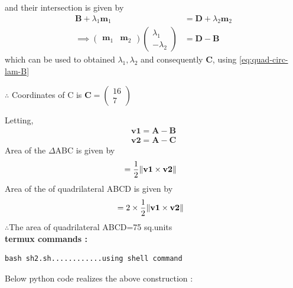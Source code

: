 \documentclass[10pt, a4paper]{article}
\newcommand{\myvec}[1]{\ensuremath{\begin{pmatrix}#1\end{pmatrix}}}
\let\vec\mathbf
\begin{document}
and their intersection is given by 
\begin{align}
	 \vec{B} + \lambda_1 \vec{m}_1
	&	= \vec{D} + \lambda_2 \vec{m}_2
	\\
	\implies \myvec{\vec{m}_1 & \vec{m}_2}\myvec{\lambda_1 \\ -\lambda_2 } &= \vec{D}-\vec{B}
\end{align}
which can be used to obtained $\lambda_1, \lambda_2$ and consequently $\vec{C}$, using 
		\eqref{eq:quad-circ-lam-B}
		\begin{center}
		$\therefore$ Coordinates of C is  $\vec{C} = \myvec{16 \\ 7}$\\
		\end{center}
Letting,
\begin{align}
\vec{v1}=\vec{A}-\vec{B}\\
\vec{v2}=\vec{A}-\vec{C}
\end{align}		
	Area of the $\Delta$ABC is given by 
	\begin{align}
&=\frac{1}{2}\norm{\vec{v1}\times\vec{v2}}
\end{align}
	Area of the of quadrilateral ABCD is given by 
	\begin{align}
&=2\times\frac{1}{2}\norm{\vec{v1}\times\vec{v2}}
\end{align}
$\therefore$The area of quadrilateral ABCD=75 sq.units\\
\textbf{termux commands :}
\begin{lstlisting}
bash sh2.sh............using shell command
\end{lstlisting}
\begin{center}
Below python code realizes the above construction :
\end{center}
\end{document}
